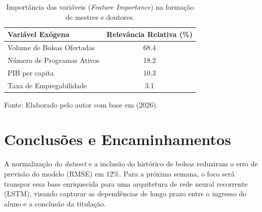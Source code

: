 \begin{table}[htpb]
    \centering
    \caption{Importância das variáveis (\textit{Feature Importance}) na formação de mestres e doutores.}
    \label{tab:feature_importance}
    
    \begin{tabular}{lc}
        \toprule
        \textbf{Variável Exógena} & \textbf{Relevância Relativa (\%)} \\
        \midrule
        Volume de Bolsas Ofertadas      & 68.4 \\
        Número de Programas Ativos      & 18.2 \\
        PIB per capita                  & 10.3 \\
        Taxa de Empregabilidade         & 3.1  \\
        \bottomrule
    \end{tabular}
    
    \vspace{0.2cm}
    {\footnotesize Fonte: Elaborado pelo autor com base em \cite{capes2026} (2026).}
\end{table}

\section{Conclusões e Encaminhamentos}
A normalização do \textit{dataset} e a inclusão do histórico de bolsas reduziram o erro de previsão do modelo (RMSE) em 12\%. Para a próxima semana, o foco será transpor essa base enriquecida para uma arquitetura de rede neural recorrente (LSTM), visando capturar as dependências de longo prazo entre o ingresso do aluno e a conclusão da titulação.
